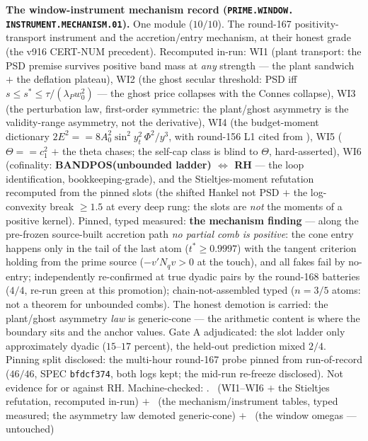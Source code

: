 \par\smallskip\noindent\textbf{The window-instrument mechanism
record (\texttt{PRIME.\allowbreak WINDOW.\allowbreak
INSTRUMENT.\allowbreak MECHANISM.01}).}
One module ($10/10$).  The round-167 positivity-transport
instrument and the accretion/entry mechanism, at their honest
grade (the v916 CERT-NUM precedent).  Recomputed in-run: WI1
(plant transport: the PSD premise survives positive band mass at
\emph{any} strength --- the plant sandwich $+$ the deflation
plateau), WI2 (the ghost secular threshold: PSD iff $s \le s^*
\le \tau/(\lambda_P w_0^2)$ --- the ghost price collapses with
the Connes collapse), WI3 (the perturbation law, first-order
symmetric: the plant/ghost asymmetry is the validity-range
asymmetry, not the derivative), WI4 (the budget-moment
dictionary $2E^2 == 8A_0^2\sin^2 y_t^2\,\Phi^2/y^3$, with
round-156 L1 cited from
), WI5 ($\Theta ==
c_1^2$ $+$ the theta chases; the self-cap class is blind to
$\Theta$, hard-asserted), WI6 (cofinality:
\textbf{BANDPOS(unbounded ladder) $\iff$ RH} --- the loop
identification, bookkeeping-grade), and the Stieltjes-moment
refutation recomputed from the pinned slots (the shifted Hankel
not PSD $+$ the log-convexity break $\ge 1.5$ at every deep
rung: the slots are \emph{not} the moments of a positive kernel).
Pinned, typed measured: \textbf{the mechanism finding} --- along
the pre-frozen source-built accretion path \emph{no partial comb
is positive}: the cone entry happens only in the tail of the
last atom ($t^* \ge 0.9997$) with the tangent criterion holding
from the prime source ($-v'N_q v > 0$ at the touch), and all
fakes fail by no-entry; independently re-confirmed at true
dyadic pairs by the round-168 batteries ($4/4$, re-run green at
this promotion); chain-not-assembled typed ($n = 3/5$ atoms:
not a theorem for unbounded combs).  The honest demotion is
carried: the plant/ghost asymmetry \emph{law} is generic-cone
--- the arithmetic content is where the boundary sits and the
anchor values.  Gate A adjudicated: the slot ladder only
approximately dyadic ($15$--$17$ percent), the held-out
prediction mixed $2/4$.  Pinning split disclosed: the multi-hour
round-167 probe pinned from run-of-record ($46/46$, SPEC
\texttt{bfdcf374}, both logs kept; the mid-run re-freeze
disclosed).  Not evidence for or against RH.
Machine-checked:
.
\mE\ (WI1--WI6 $+$ the Stieltjes refutation, recomputed in-run)
$+$ \mC\ (the mechanism/instrument tables, typed measured; the
asymmetry law demoted generic-cone) $+$ \mO\ (the window omegas
--- untouched)
\par\smallskip


